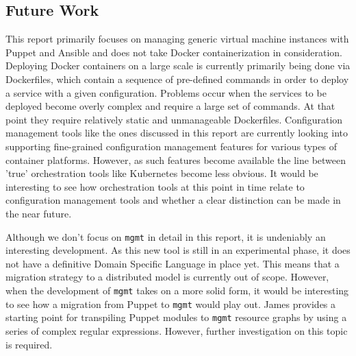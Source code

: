 \subsection{Future Work}\label{subsec:futurework}
This report primarily focuses on managing generic virtual machine instances with Puppet and Ansible and does not take Docker containerization in consideration. Deploying Docker containers on a large scale is currently primarily being done via Dockerfiles, which contain a sequence of pre-defined commands in order to deploy a service with a given configuration. Problems occur when the services to be deployed become overly complex and require a large set of commands. At that point they require relatively static and unmanageable Dockerfiles. Configuration management tools like the ones discussed in this report are currently looking into supporting fine-grained configuration management features for various types of container platforms. However, as such features become available the line between 'true' orchestration tools like Kubernetes \cite{kubernetes_2016} become less obvious. It would be interesting to see how orchestration tools at this point in time relate to configuration management tools and whether a clear distinction can be made in the near future.

Although we don't focus on \texttt{mgmt} in detail in this report, it is undeniably an interesting development. As this new tool is still in an experimental phase, it does not have a definitive Domain Specific Language in place yet. This means that a migration strategy to a distributed model is currently out of scope. However, when the development of \texttt{mgmt} takes on a more solid form, it would be interesting to see how a migration from Puppet to \texttt{mgmt} would play out. James \cite{frank_2016} provides a starting point for transpiling Puppet modules to \texttt{mgmt} resource graphs by using a series of complex regular expressions. However, further investigation on this topic is required.
